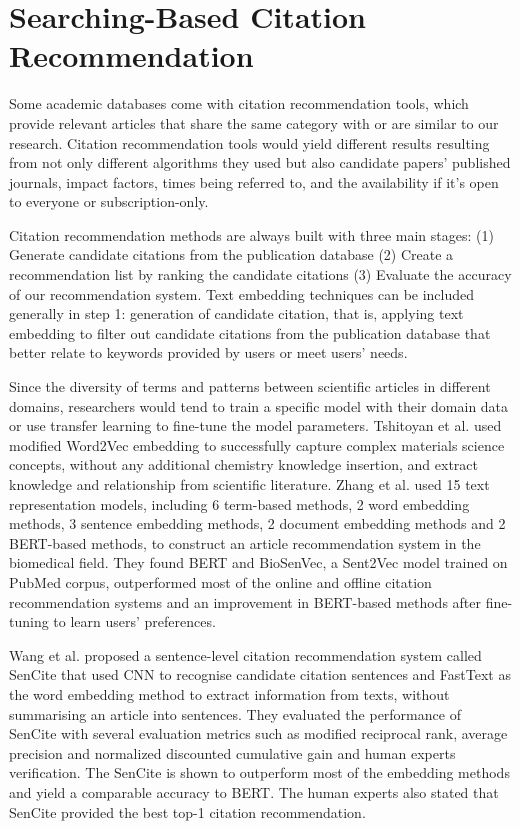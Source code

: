 \section{Searching-Based Citation Recommendation}

Some academic databases come with citation recommendation tools, which provide relevant articles that share the same category with or are similar to our research.
Citation recommendation tools would yield different results resulting from not only different algorithms they used but also candidate papers' published journals, impact factors, times being referred to, and the availability if it's open to everyone or subscription-only.

Citation recommendation methods are always built with three main stages: (1) Generate candidate citations from the publication database (2) Create a recommendation list by ranking the candidate citations (3) Evaluate the accuracy of our recommendation system.\cite{ma2020}
Text embedding techniques can be included generally in step 1: generation of candidate citation, that is, applying text embedding to filter out candidate citations from the publication database that better relate to keywords provided by users or meet users' needs.

Since the diversity of terms and patterns between scientific articles in different domains, researchers would tend to train a specific model with their domain data or use transfer learning to fine-tune the model parameters.
Tshitoyan et al.\cite{tshitoyan2019} used modified Word2Vec embedding to successfully capture complex materials science concepts, without any additional chemistry knowledge insertion, and extract knowledge and relationship from scientific literature.
Zhang et al.\cite{zhang2022} used 15 text representation models, including 6 term-based methods, 2 word embedding methods, 3 sentence embedding methods, 2 document embedding methods and 2 BERT-based methods, to construct an article recommendation system in the biomedical field.
They found BERT and BioSenVec, a Sent2Vec model trained on PubMed corpus, outperformed most of the online and offline citation recommendation systems and an improvement in BERT-based methods after fine-tuning to learn users' preferences.

Wang et al.\cite{wang2022} proposed a sentence-level citation recommendation system called SenCite that used CNN to recognise candidate citation sentences and FastText as the word embedding method to extract information from texts, without summarising an article into sentences.
They evaluated the performance of SenCite with several evaluation metrics such as modified reciprocal rank, average precision and normalized discounted cumulative gain and human experts verification.
The SenCite is shown to outperform most of the embedding methods and yield a comparable accuracy to BERT.
The human experts also stated that SenCite provided the best top-1 citation recommendation.